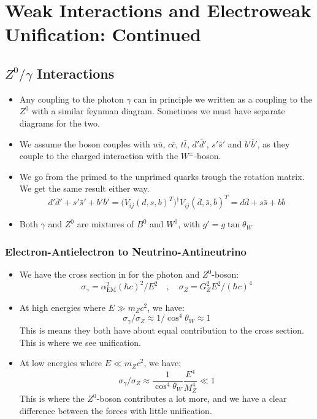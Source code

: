 \section{Weak Interactions and Electroweak Unification: Continued}
\subsection{$Z^{0} / γ$ Interactions}
\begin{itemize}
    \item Any coupling to the photon $γ$ can in principle we written as a coupling to the $Z^{0}$ with a similar feynman diagram. Sometimes we must have separate diagrams for the two.
    \item We assume the boson couples with $u \bar{u}$, $c \bar{c}$, $t \bar{t}$, $d' \bar{d}'$, $s' \bar{s}'$ and $b' \bar{b}'$, as they couple to the charged interaction with the $W^{±}$-boson. 
    \item We go from the primed to the unprimed quarks trough the rotation matrix. We get the same result either way. 
    \begin{equation}
      d' \bar{d}' + s' \bar{s}' + b' \bar{b}' = \Big(V_{ij}(d, s, b)^{T}\Big)^{†} V_{ij}(\bar{d}, \bar{s}, \bar{b})^{T} = d \bar{d} + s \bar{s} + b \bar{b}
    \end{equation} 
    \item Both $γ$ and $Z^{0}$ are mixtures of $B^{0}$ and $W^{0}$, with $g' = g \tan θ_W$
\end{itemize}

\subsubsection{Electron-Antielectron to Neutrino-Antineutrino}
\begin{itemize}
    \item We have the cross section in for the photon and $Z^{0}$-boson:
    \begin{equation}
      σ_{γ} = α_{\text{EM}}^2(ℏc)^2 / E^2 \quad , \quad  σ_{Z} = G_{Z}^2 E^2 / (ℏc)^4
    \end{equation}
    \item At high energies where $E ≫ m_{Z}c^2$, we have: 
    \begin{equation}
      σ_{γ} / σ_{Z} ≈ 1 / \cos ^4 θ_{W} ≈ 1
    \end{equation}
    This is means they both have about equal contribution to the cross section. This is where we see unification. 
    \item At low energies where $E ≪ m_{Z}c^2$, we have:
    \begin{equation}
        σ_{γ}    / σ_{Z} ≈  \frac{1}{\cos ^4 θ_{W}} \frac{E^{4}}{M_{Z}^{4}} ≪ 1
    \end{equation}
    This is where the $Z^{0}$-boson contributes a lot more, and we have a clear difference between the forces with little unification. 
\end{itemize}

